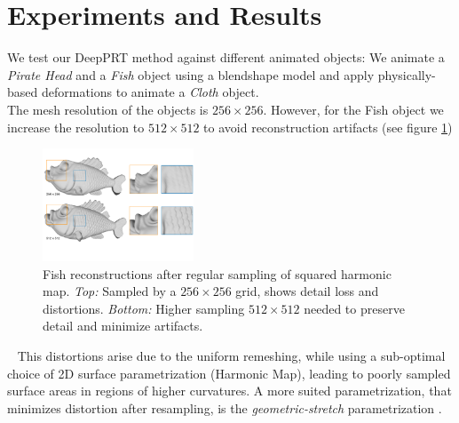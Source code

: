\section{Experiments and Results}  \label{Sec:Experiments}
We test our DeepPRT method against different animated objects: We animate a \textit{Pirate Head} and a \textit{Fish} object using a blendshape model and apply physically-based deformations to animate a \textit{Cloth} object.
\\
The mesh resolution of the objects is $256 \times 256$. However, for the Fish object we increase the resolution to $512 \times 512$ to avoid reconstruction artifacts (see figure \ref{Fig: Fish Reconstruction})
\begin{figure}[H]
  \centering
    \includegraphics[width=0.4\textwidth]{Figures/fish}
     \caption{Fish reconstructions after regular sampling of squared harmonic map. \textit{Top:} Sampled by a $256 \times 256$ grid, shows detail loss and distortions. \textit{Bottom:} Higher sampling $512 \times 512$ needed to preserve detail and minimize artifacts.}
     \label{Fig: Fish Reconstruction}
\end{figure}~
This distortions arise due to the uniform remeshing, while using a sub-optimal choice of 2D surface parametrization (Harmonic Map), leading to poorly sampled surface areas in regions of higher curvatures. A more suited parametrization, that minimizes distortion after resampling, is the \textit{geometric-stretch} parametrization  \cite{gu2002geometry}.
